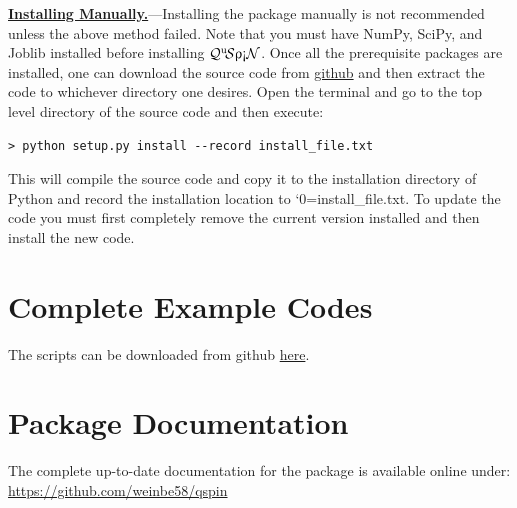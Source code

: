 \documentclass{SciPost}
\newcommand\0{\scalebox{-1}[1]{0}}
\let\svttfamily\ttfamily
\renewcommand\ttfamily{\svttfamily\catcode`0=\active }
\renewcommand\texttt{\bgroup\ttfamily\texttthelp}
\def\texttthelp#1{#1\egroup}
\newcommand{\qspin}{$\mathcal{Q}^{\mathrm{u}}\!\mathcal{S}\uprho\mathrm{\text{\textexclamdown}}\mathcal{N}$}
\begin{document}
\begin{appendix}
\underline{\bf Installing Manually.}---Installing the package manually is not recommended unless the above method failed. Note that you must have NumPy, SciPy, and Joblib installed before installing \qspin. Once all the prerequisite packages are installed, one can download the source code from \href{https://github.com/weinbe58/qspin/tree/master}{github} and then extract the code to whichever directory one desires. Open the terminal and go to the top level directory of the source code and then execute:  
\begin{lstlisting}[numbers=none]
> python setup.py install --record install_file.txt
\end{lstlisting}
This will compile the source code and copy it to the installation directory of Python and record the installation location to \texttt{install\_file.txt}. To update the code you must first completely remove the current version installed and then install the new code. 


\newpage
\section{Complete Example Codes}
The scripts can be downloaded from github \href{https://github.com/weinbe58/qspin_paper/tree/master/scripts}{here}.
\label{app:scripts}

\newpage

\newpage



\section{Package Documentation}
\label{app:doc}
The complete up-to-date documentation for the package is available online under:\\

\href{https://github.com/weinbe58/qspin}{https://github.com/weinbe58/qspin}\\

\end{appendix}


%
%




\nolinenumbers
\end{document}

